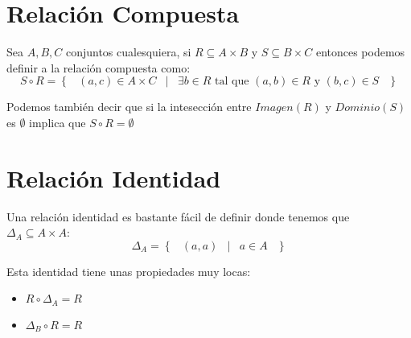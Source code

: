 \documentclass[12pt, fleqn]{report}                             %
\DeclareMathOperator \Space {\quad}                             %
\DeclareMathOperator \MiniSpace {\;}                            %
\newcommand \Such {\MiniSpace|\MiniSpace}                       %
\newcommand{\Set}[1]{\left\{ \MiniSpace #1 \MiniSpace \right\}} %
\begin{document}
        \section{Relación Compuesta}

            Sea $A, B, C$ conjuntos cualesquiera, si $R \subseteq A \times B$ 
            y $S \subseteq B \times C$ entonces podemos definir a la relación
            compuesta como:            
            \begin{equation*}
                S \circ R = \Set{ (a,c) \in A \times C \Such
                        \exists b \in R \text{ tal que } 
                            (a,b) \in R \text{ y } (b, c) \in S
                    }
            \end{equation*}

            Podemos también decir que si la intesección entre $Imagen(R)$ y
            $Dominio(S)$ es $\emptyset$ implica que $S \circ R = \emptyset$


        \section{Relación Identidad}

            Una relación identidad es bastante fácil de definir donde tenemos
            que $\Delta_{A} \subseteq A \times A$:
            \begin{equation*}
                \Delta_{A} = \Set{ (a, a) \Such a \in A }
            \end{equation*}

            Esta identidad tiene unas propiedades muy locas:
            \begin{itemize}
                \item $R \circ \Delta_{A} = R$
                \item $\Delta_{B} \circ R = R$
            \end{itemize}







        \clearpage
\end{document}
